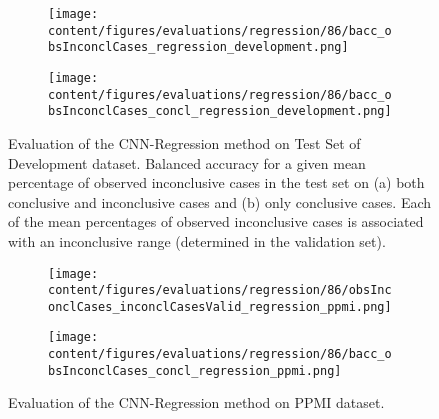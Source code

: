 \begin{figure}[t]
  \begin{subfigure}{0.9\textwidth}
    \centering
    \texttt{[image: content/figures/evaluations/regression/86/bacc\_obsInconclCases\_regression\_development.png]}
    \subcaption{}
    \label{fig:bacc_obsInconclCases_regression_development}
  \end{subfigure}
  \hfill
  \begin{subfigure}{0.9\textwidth}
    \centering
    \texttt{[image: content/figures/evaluations/regression/86/bacc\_obsInconclCases\_concl\_regression\_development.png]}
    \subcaption{}
    \label{fig:bacc_obsInconclCases_concl_regression_development}
  \end{subfigure}

  \caption{Evaluation of the CNN-Regression method on Test Set of Development dataset.
  Balanced accuracy for a given mean percentage of observed inconclusive cases in the test set on 
  (a) both conclusive and inconclusive cases and (b) only conclusive cases. 
  Each of the mean percentages of observed inconclusive cases is associated with an inconclusive range (determined in the validation set). }
  \label{fig:bacc_obsInconclCases_regression_development_full}
\end{figure}




\begin{figure}[t]
  \begin{subfigure}{0.9\textwidth}
    \centering
    \texttt{[image: content/figures/evaluations/regression/86/obsInconclCases\_inconclCasesValid\_regression\_ppmi.png]}
    \label{fig:obsInconclCases_inconclCasesValid_regression_ppmi}
  \end{subfigure}
  \hfill
  \begin{subfigure}{0.9\textwidth}
    \centering
    \texttt{[image: content/figures/evaluations/regression/86/bacc\_obsInconclCases\_concl\_regression\_ppmi.png]}
    \label{fig:bacc_obsInconclCases_concl_regression_ppmi}
  \end{subfigure}
  \caption{Evaluation of the CNN-Regression method on PPMI dataset.}
\end{figure}



